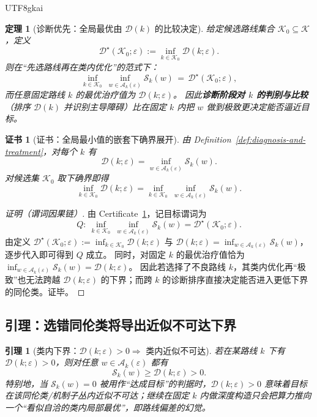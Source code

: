 \documentclass[12pt]{article}
\newtheorem{theorem}{定理}[section]
\newtheorem{lemma}{引理}[section]
\newtheorem{certificate}{证书}[section]
\begin{document}
\begin{CJK*}{UTF8}{gkai}
\begin{theorem}[诊断优先：全局最优由 $\mathcal{D}(k)$ 的比较决定]
\label{thm:diagnosis-priority}
给定候选路线集合 $\mathcal{K}_0\subseteq\mathcal{K}$，定义
\[
\mathcal{D}^\star(\mathcal{K}_0;\varepsilon):=\inf_{k\in\mathcal{K}_0}\mathcal{D}(k;\varepsilon).
\]
则在“先选路线再在类内优化”的范式下：
\[
\inf_{k\in\mathcal{K}_0}\ \inf_{w\in\mathcal{A}_k(\varepsilon)} \mathcal{S}_k(w)
\,=\,
\mathcal{D}^\star(\mathcal{K}_0;\varepsilon),
\]
而任意固定路线 $k$ 的最优治疗值为 $\mathcal{D}(k;\varepsilon)$。
因此\textbf{诊断阶段对 $k$ 的判别与比较}（排序 $\mathcal{D}(k)$ 并识别主导障碍）比在固定 $k$ 内把 $w$ 做到极致更决定能否逼近目标。
\end{theorem}

\begin{certificate}[证书：全局最小值的嵌套下确界展开]
\label{cert:diagnosis-priority}
由 Definition~\ref{def:diagnosis-and-treatment}，对每个 $k$ 有
\[
\mathcal{D}(k;\varepsilon)=\inf_{w\in\mathcal{A}_k(\varepsilon)}\mathcal{S}_k(w).
\]
对候选集 $\mathcal{K}_0$ 取下确界即得
\[
\inf_{k\in\mathcal{K}_0}\mathcal{D}(k;\varepsilon)=\inf_{k\in\mathcal{K}_0}\ \inf_{w\in\mathcal{A}_k(\varepsilon)}
  \mathcal{S}_k(w).
\]
\end{certificate}

\begin{proof}[证明（谓词因果链）]
由 Certificate~\ref{cert:diagnosis-priority}，记目标谓词为
\[
Q:\ \inf_{k\in\mathcal{K}_0}\ \inf_{w\in\mathcal{A}_k(\varepsilon)}\mathcal{S}_k(w)=\mathcal{D}^\star(\mathcal{K}_0;
  \varepsilon).
\]
由定义 $\mathcal{D}^\star(\mathcal{K}_0;\varepsilon):=\inf_{k\in\mathcal{K}_0}\mathcal{D}(k;\varepsilon)$ 与 $\mathcal{D}(k;
  \varepsilon)=\inf_{w\in\mathcal{A}_k(\varepsilon)}\mathcal{S}_k(w)$，逐步代入即可得到 $Q$ 成立。
同时，对固定 $k$ 的最优治疗值恰为 $\inf_{w\in\mathcal{A}_k(\varepsilon)}\mathcal{S}_k(w)=\mathcal{D}(k;\varepsilon)$。
因此若选择了不良路线 $k$，其类内优化再“极致”也无法跨越 $\mathcal{D}(k;\varepsilon)$ 的下界；而跨 $k$ 的诊断排序直接决定能否进入更低下界的同伦类。证毕。
\end{proof}

\subsection{引理：选错同伦类将导出近似不可达下界}

\begin{lemma}[类内下界：$\mathcal{D}(k;\varepsilon)>0 \Rightarrow$ 类内近似不可达]
\label{lem:wrong-class}
若在某路线 $k$ 下有 $\mathcal{D}(k;\varepsilon)>0$，则对任意 $w\in\mathcal{A}_k(\varepsilon)$ 都有
\[
\mathcal{S}_k(w)\ge \mathcal{D}(k;\varepsilon)>0.
\]
特别地，当 $\mathcal{S}_k(w)=0$ 被用作“达成目标”的判据时，$\mathcal{D}(k;\varepsilon)>0$ 意味着目标在该同伦类/机制子丛内近似不可达；继续在固定 $k$
  内做深度构造只会把算力推向一个“看似自洽的类内局部最优”，即路线偏差的幻觉。
\end{lemma}


\end{CJK*}
\end{document}
